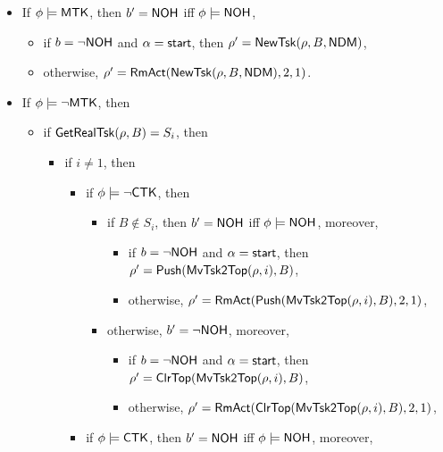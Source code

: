 \begin{itemize}
    \item If $\phi \models {\sf MTK}$, then $b' = {\sf NOH}$ iff $\phi  \models {\sf NOH}$, 
    \begin{itemize}
    	\item if $b = \neg {\sf NOH}$ and $\alpha = {\mathsf{start} }$, then $\rho'=\mathsf{NewTsk}(\rho, B, {\sf NDM})$, 
	\item otherwise, $\rho'= \mathsf{RmAct}(\mathsf{NewTsk}(\rho, B, {\sf NDM}), 2, 1)$.
    \end{itemize}
    \item If $\phi \models \neg {\sf MTK}$, then
   \begin{itemize}
        \item if $\mathsf{GetRealTsk}(\rho, B) = S_i$, then
	\begin{itemize}
		\item if $i \neq 1$, then
        			\begin{itemize}
            			\item if $\phi \models \neg {\sf CTK}$, then 
				\begin{itemize}
					\item if $B \not \in S_i$, then $b' = {\sf NOH}$ iff $\phi  \models {\sf NOH}$, moreover, 
					\begin{itemize}
						\item if $b = \neg {\sf NOH}$ and $\alpha = {\mathsf{start} }$, then $\rho' = \mathsf{Push}(\mathsf{MvTsk2Top}(\rho, i), B)$, 
						\item otherwise, $\rho' = \mathsf{RmAct}(\mathsf{Push}(\mathsf{MvTsk2Top}(\rho, i), B), 2, 1)$, 
					\end{itemize}
					\item otherwise, $b' = \neg {\sf NOH}$,
					moreover, 
					\begin{itemize}
						\item if $b = \neg {\sf NOH}$ and $\alpha = {\mathsf{start} }$, then $\rho'=\mathsf{ClrTop}(\mathsf{MvTsk2Top}(\rho, i), B)$, 
						\item otherwise,  $\rho'= \mathsf{RmAct}(\mathsf{ClrTop}(\mathsf{MvTsk2Top}(\rho, i), B), 2, 1)$, 
					\end{itemize}
				\end{itemize}
            			\item if $\phi \models {\sf CTK}$, then $b' = {\sf NOH}$ iff $\phi  \models {\sf NOH}$, moreover, 

\end{itemize}
\end{itemize}
\end{itemize}
\end{itemize}
